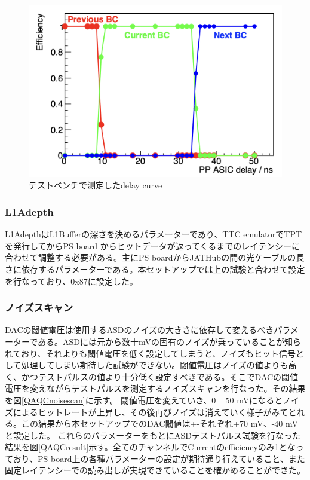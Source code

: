 \begin{figure} 
\centering
\includegraphics[width=16cm]{fig/QAQC/QAQCdelayscan.png}
\caption[ディレイカーブ]{テストベンチで測定したdelay curve}
\label{QAQCdelayscan}
\end{figure}

\subsubsection{L1Adepth}
L1AdepthはL1Bufferの深さを決めるパラメーターであり、TTC emulatorでTPTを発行してからPS board からヒットデータが返ってくるまでのレイテンシーに合わせて調整する必要がある。主にPS boardからJATHubの間の光ケーブルの長さに依存するパラメーターである。本セットアップでは上の試験と合わせて設定を行なっており、0x87に設定した。
\baselineskip

\subsubsection{ノイズスキャン}
DACの閾値電圧は使用するASDのノイズの大きさに依存して変えるべきパラメーターである。ASDには元から数十mVの固有のノイズが乗っていることが知られており、それよりも閾値電圧を低く設定してしまうと、ノイズもヒット信号として処理してしまい期待した試験ができない。閾値電圧はノイズの値よりも高く、かつテストパルスの値より十分低く設定すべきである。そこでDACの閾値電圧を変えながらテストパルスを測定するノイズスキャンを行なった。その結果を図\ref{QAQCnoisescan}に示す。
閾値電圧を変えていき、0 ~ 50 mVになるとノイズによるヒットレートが上昇し、その後再びノイズは消えていく様子がみてとれる。この結果から本セットアップでのDAC閾値は+-それぞれ+70 mV、-40 mVと設定した。
これらのパラメーターをもとにASDテストパルス試験を行なった結果を図\ref{QAQCresult}示す。全てのチャンネルでCurrentのefficiencyのみ1となっており、PS board上の各種パラメーターの設定が期待通り行えていること、また固定レイテンシーでの読み出しが実現できていることを確かめることができた。
\baselineskip

